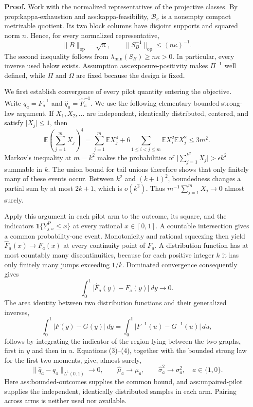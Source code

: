 \textbf{Proof.}
Work with the normalized representatives of the projective classes.  By prop:kappa-exhaustion and ass:kappa-feasibility, \(\mathcal B_\kappa\) is a nonempty compact metrizable quotient.  Its two block columns have disjoint supports and squared norm \(n\).  Hence, for every normalized representative,
\[
 \lVert B\rVert_{\mathrm{op}}=\sqrt n,
 \qquad
 \lVert S_B^{-1}\rVert_{\mathrm{op}}\le (n\kappa)^{-1}.
 \tag{1}
\]
The second inequality follows from \(\lambda_{\min}(S_B)\ge n\kappa>0\).  In particular, every inverse used below exists.  Assumption ass:exposure-positivity makes \(\Pi^{-1}\) well defined, while \(\Pi\) and \(\Omega\) are fixed because the design is fixed.

We first establish convergence of every pilot quantity entering the objective.  Write \(q_a=F_a^{-1}\) and \(\widehat q_a=\widehat F_a^{-1}\).  We use the following elementary bounded strong-law argument.  If \(X_1,X_2,\ldots\) are independent, identically distributed, centered, and satisfy \(\lvert X_j\rvert\le1\), then
\[
 \mathbb E\!\left(\sum_{j=1}^mX_j\right)^4
 =\sum_{j=1}^m\mathbb EX_j^4
  +6\sum_{1\le i<j\le m}\mathbb EX_i^2\mathbb EX_j^2
 \le 3m^2.
 \tag{2}
\]
Markov's inequality at \(m=k^2\) makes the probabilities of
\(\lvert\sum_{j=1}^{k^2}X_j\rvert>\epsilon k^2\) summable in \(k\).  The union bound for tail unions therefore shows that only finitely many of these events occur.  Between \(k^2\) and \((k+1)^2\), boundedness changes a partial sum by at most \(2k+1\), which is \(o(k^2)\).  Thus \(m^{-1}\sum_{j=1}^mX_j\to0\) almost surely.

Apply this argument in each pilot arm to the outcome, its square, and the indicators \(\mathbf1\{Y^P_{j,a}\le x\}\) at every rational \(x\in[0,1]\).  A countable intersection gives a common probability-one event.  Monotonicity and rational squeezing then yield \(\widehat F_a(x)\to F_a(x)\) at every continuity point of \(F_a\).  A distribution function has at most countably many discontinuities, because for each positive integer \(k\) it has only finitely many jumps exceeding \(1/k\).  Dominated convergence consequently gives
\[
 \int_0^1\lvert\widehat F_a(y)-F_a(y)\rvert\,dy\longrightarrow0.
 \tag{3}
\]
The area identity between two distribution functions and their generalized inverses,
\[
 \int_0^1\lvert F(y)-G(y)\rvert\,dy
 =\int_0^1\lvert F^{-1}(u)-G^{-1}(u)\rvert\,du,
 \tag{4}
\]
follows by integrating the indicator of the region lying between the two graphs, first in \(y\) and then in \(u\).  Equations (3)--(4), together with the bounded strong law for the first two moments, give, almost surely,
\[
 \lVert\widehat q_a-q_a\rVert_{L^1(0,1)}\to0,
 \qquad
 \widehat\mu_a\to\mu_a,
 \qquad
 \widehat\sigma_a^2\to\sigma_a^2,
 \quad a\in\{1,0\}.
 \tag{5}
\]
Here ass:bounded-outcomes supplies the common bound, and ass:unpaired-pilot supplies the independent, identically distributed samples in each arm.  Pairing across arms is neither used nor available.

